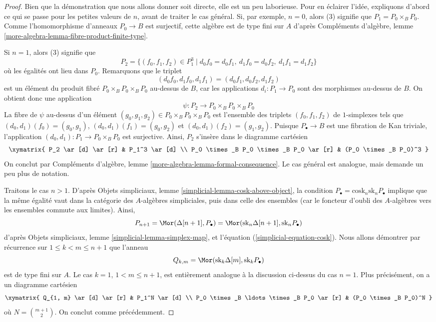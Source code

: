 \begin{proof}
Bien que la démonstration que nous allons donner soit directe, elle est un peu
laborieuse. Pour en éclairer l'idée, expliquons d'abord ce qui se passe pour
les petites valeurs de $n$, avant de traiter le cas général. Si, par exemple,
$n = 0$, alors (3) signifie que $P_1 = P_0 \times_B P_0$. Comme
l'homomorphisme d'anneaux $P_0 \to B$ est surjectif, cette algèbre est de type
fini sur $A$ d'après Compléments d'algèbre, lemme
\ref{more-algebra-lemma-fibre-product-finite-type}.

\medskip\noindent
Si $n = 1$, alors (3) signifie que
$$
P_2 = \{(f_0, f_1, f_2) \in P_1^3 \mid
d_0f_0 = d_0f_1,\ d_1f_0 = d_0f_2,\ d_1f_1 = d_1f_2 \}
$$
où les égalités ont lieu dans $P_0$. Remarquons que le triplet
$$
(d_0f_0, d_1f_0, d_1f_1) = (d_0f_1, d_0f_2, d_1f_2)
$$
est un élément du produit fibré $P_0 \times_B P_0 \times_B P_0$ au-dessus de
$B$, car les applications $d_i : P_1 \to P_0$ sont des morphismes au-dessus
de $B$. On obtient donc une application
$$
\psi : P_2 \longrightarrow P_0 \times_B P_0 \times_B P_0
$$
La fibre de $\psi$ au-dessus d'un élément
$(g_0, g_1, g_2) \in P_0 \times_B P_0 \times_B P_0$
est l'ensemble des triplets $(f_0, f_1, f_2)$ de $1$-simplexes tels que
$(d_0, d_1)(f_0) = (g_0, g_1)$, $(d_0, d_1)(f_1) = (g_0, g_2)$ et
$(d_0, d_1)(f_2) = (g_1, g_2)$. Puisque $P_\bullet \to B$ est une fibration
de Kan triviale, l'application $(d_0, d_1) : P_1 \to P_0 \times_B P_0$ est
surjective. Ainsi, $P_2$ s'insère dans le diagramme cartésien
$$
\xymatrix{
P_2 \ar[d] \ar[r] & P_1^3 \ar[d] \\
P_0 \times_B P_0 \times_B P_0 \ar[r] & (P_0 \times_B P_0)^3
}
$$
On conclut par Compléments d'algèbre, lemme
\ref{more-algebra-lemma-formal-consequence}. Le cas général est analogue, mais
demande un peu plus de notation.

\medskip\noindent
Traitons le cas $n > 1$. D'après Objets simpliciaux, lemme
\ref{simplicial-lemma-cosk-above-object}, la condition
$P_\bullet = \text{cosk}_n \text{sk}_n P_\bullet$ implique que la même égalité
vaut dans la catégorie des $A$-algèbres simpliciales, puis dans celle des
ensembles (car le foncteur d'oubli des $A$-algèbres vers les ensembles commute
aux limites). Ainsi,
$$
P_{n + 1} =
\Mor(\Delta[n + 1], P_\bullet) =
\Mor(\text{sk}_n \Delta[n + 1], \text{sk}_n P_\bullet)
$$
d'après Objets simpliciaux, lemme \ref{simplicial-lemma-simplex-map}, et
l'équation (\ref{simplicial-equation-cosk}). Nous allons démontrer par
récurrence sur $1 \leq k < m \leq n + 1$ que l'anneau
$$
Q_{k, m} = \Mor(\text{sk}_k \Delta[m], \text{sk}_k P_\bullet)
$$
est de type fini sur $A$. Le cas $k = 1$, $1 < m \leq n + 1$, est entièrement
analogue à la discussion ci-dessus du cas $n = 1$. Plus précisément, on a un
diagramme cartésien
$$
\xymatrix{
Q_{1, m} \ar[d] \ar[r] & P_1^N \ar[d] \\
P_0 \times_B \ldots \times_B P_0 \ar[r] & (P_0 \times_B P_0)^N
}
$$
où $N = {m + 1 \choose 2}$. On conclut comme précédemment.


\end{proof}
